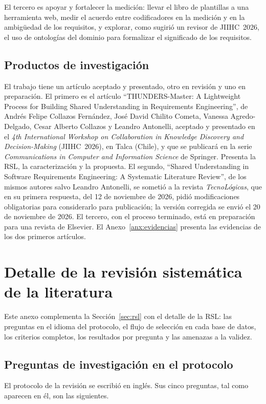 \documentclass[12pt,letterpaper,oneside]{report}
\begin{document}
El tercero es apoyar y fortalecer la medición: llevar el libro de plantillas a
una herramienta web, medir el acuerdo entre codificadores en la medición y en la
ambigüedad de los requisitos, y explorar, como sugirió un revisor de
JIIHC~2026, el uso de ontologías del dominio para formalizar el significado de
los requisitos.

\section{Productos de investigación}
\label{sec:productos}
El trabajo tiene un artículo aceptado y presentado, otro en revisión y uno en
preparación. El
primero es el artículo ``THUNDERS-Master: A Lightweight Process for Building
Shared Understanding in Requirements Engineering'', de Andrés Felipe Collazos
Fernández, José David Chilito Cometa, Vanessa Agredo-Delgado, Cesar Alberto
Collazos y Leandro Antonelli, aceptado y presentado en el \textit{4th
International Workshop on Collaboration in Knowledge Discovery and
Decision-Making} (JIIHC~2026), en Talca (Chile), y que se publicará en la serie
\textit{Communications in Computer and Information Science} de Springer. Presenta
la RSL, la caracterización y la propuesta. El segundo, ``Shared Understanding
in Software Requirements Engineering: A Systematic Literature Review'', de los
mismos autores salvo Leandro Antonelli, se sometió a la revista
\textit{TecnoLógicas}, que en su primera respuesta, del 12 de noviembre de 2026,
pidió modificaciones obligatorias para considerarlo para publicación; la versión
corregida se envió el 20 de noviembre de 2026. El tercero, con el proceso terminado, está en
preparación para una revista de Elsevier. El Anexo~\ref{anx:evidencias} presenta
las evidencias de los dos primeros artículos.





\appendix
\renewcommand{\appendixname}{Anexo}

\chapter{Detalle de la revisión sistemática de la literatura}
\label{anx:rsl}
Este anexo complementa la Sección~\ref{sec:rsl} con el detalle de la RSL: las
preguntas en el idioma del protocolo, el flujo de selección en cada base de
datos, los criterios completos, los resultados por pregunta y las amenazas a la
validez.

\section{Preguntas de investigación en el protocolo}
El protocolo de la revisión se escribió en inglés. Sus cinco preguntas, tal como
aparecen en él, son las siguientes.
\end{document}
